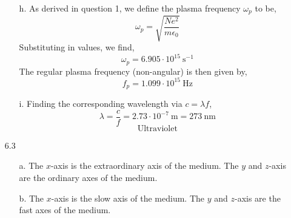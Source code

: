 \documentclass[12pt]{article}
\begin{document}
\begin{enumerate}
\begin{enumerate}
		\item [h.]
		As derived in question 1, we define the plasma frequency $\omega_p$ to be,
		\[\omega_p=\sqrt{\frac{Ne^2}{m\epsilon_0}}\]
		Substituting in values, we find,
		\[\boxed{\omega_p=6.905 \cdot 10^{15} \: \mathrm{s}^{-1}}\]
		The regular plasma frequency (non-angular) is then given by,
		\[\boxed{f_p=1.099\cdot 10^{15} \: \mathrm{Hz}}\]


		\item [i.]
		Finding the corresponding wavelength via $c=\lambda f$,
		\[\lambda = \frac{c}{f}=2.73\cdot 10^{-7} \: \mathrm{m} = 273 \: \mathrm{nm}\]
		\[\boxed{\text{Ultraviolet}}\]

	\end{enumerate}

	\item [6.3]
	\begin{enumerate}
		\item [a.]
		The $x$-axis is the extraordinary axis of the medium.
		The $y$ and $z$-axis are the ordinary axes of the medium.

		\item [b.]
		The $x$-axis is the slow axis of the medium.
		The $y$ and $z$-axis are the fast axes of the  medium.


\end{enumerate}
\end{enumerate}
\end{document}
